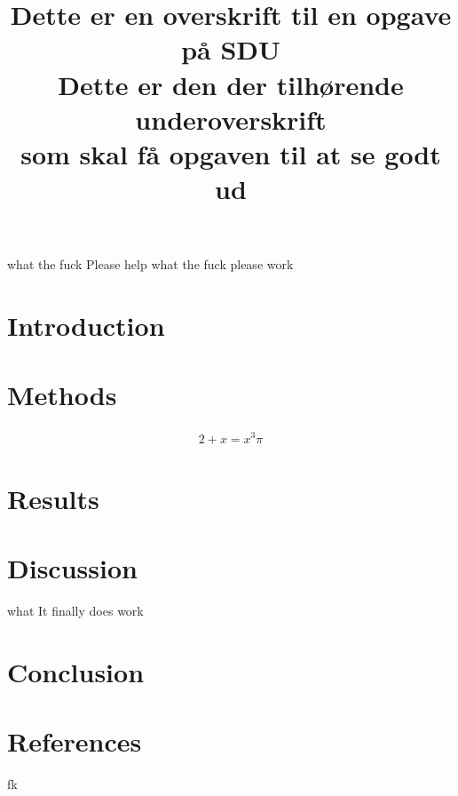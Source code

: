 \documentclass[12pt]{article}
\date{\vspace{-12ex}}
\author{}
\title{%
  Dette er en overskrift til en opgave på SDU \\
  \vspace{1ex}
  \large Dette er den der tilhørende underoverskrift \\
    som skal få opgaven til at se godt ud}
\begin{document}

\tableofcontents
\thispagestyle{empty}
\newpage
\setcounter{page}{1}
what the fuck
Please help
what the fuck
please work
\section*{Introduction}

\section*{Methods}
\begin{align}
	2+x=x^3 \pi
\end{align}

\section*{Results}

\section*{Discussion}
what
It finally does work

\section*{Conclusion}

\section*{References}
fk
\end{document}

